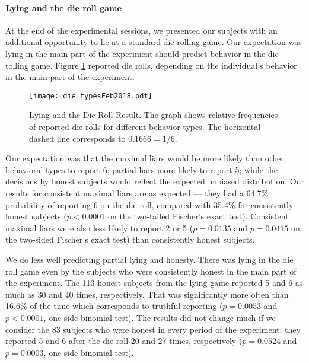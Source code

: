 \documentclass[12pt]{article}
\begin{document}
\paragraph{Lying and the die roll game}

\par At the end of the experimental sessions, we presented our subjects with an additional opportunity to lie at a standard die-rolling game.\footnotemark{} Our expectation was lying in the main part of the experiment should predict behavior in the die-tolling game.  Figure \ref{fig:dietoss} reported die rolls, depending on the individual's behavior in the main part of the experiment. 

\begin{figure}[!htb]
\centerline{\texttt{[image: die\_typesFeb2018.pdf]}}
\caption{Lying and the Die Roll Result. The graph shows relative frequencies of reported die rolls for different behavior types. The horizontal dashed line corresponds to $0.1666 = 1/6$. }\label{fig:dietoss}
\end{figure}


\par Our expectation was that the maximal liars would be more likely than other behavioral types to report 6; partial liars more likely to report 5; while the decisions by honest subjects would reflect the expected unbiased distribution. Our results for consistent maximal liars are as expected --- they had a 64.7\% probability of reporting 6 on the die roll, compared with 35.4\% for consistently honest subjects ($p<0.0001$ on the two-tailed Fischer's exact test). Consistent maximal liars were also less likely to report 2 or 5 ($p=0.0135$ and $p=0.0415$ on the two-sided Fischer's exact test) than consistently honest subjects. 
\label{stata:robustcheat}

\par We do less well predicting partial lying and honesty.  There was lying in the die roll game even by the subjects who were consistently honest in the main part of the experiment. The 113 honest subjects from the lying game reported 5 and 6 as much as 30 and 40 times, respectively. That was significantly more often than 16.6\% of the time which corresponds to truthful reporting ($p=0.0053$ and $p<0.0001$, one-side binomial test). The results did not change much if we consider the 83 subjects who were honest in every period of the experiment; they reported 5 and 6 after the die roll 20 and 27 times, respectively ($p=0.0524$ and $p=0.0003$, one-side binomial test).
\label{stata:robustcheat_bino}
\end{document}
